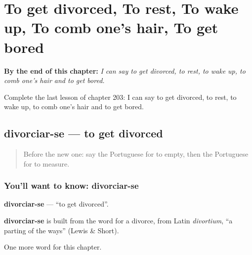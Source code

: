 
\chapter{To get divorced, To rest, To wake up, To comb one's hair, To get bored}
\label{ch:pt-to-get-divorced-to-rest-to-wake-up-to-comb-one-s-hair-to-get-bored}

\begin{chapteropening}
\textbf{By the end of this chapter:} \emph{I can say to get divorced, to rest, to wake up, to comb one's hair and to get bored.}

Complete the last lesson of chapter 203: I can say to get divorced, to rest, to wake up, to comb one's hair and to get bored.
\end{chapteropening}

\section[divorciar-se]{divorciar-se — to get divorced}

\label{lesson:PT-C203-divorciar-se}



\begin{quote}
Before the new one: say the Portuguese for to empty, then the Portuguese for to measure.
\end{quote}

\subsection*{You'll want to know: divorciar-se}
\textbf{divorciar-se} — \textquotedblleft{}to get divorced\textquotedblright{}.

\begin{cousinweb}
\textbf{divorciar-se} is built from the word for a divorce, from Latin \emph{divortium}, \textquotedblleft{}a parting of the ways\textquotedblright{} (Lewis \& Short).
\end{cousinweb}

\begin{grammarlens}[title={What you've built}]
One more word for this chapter.
\end{grammarlens}

